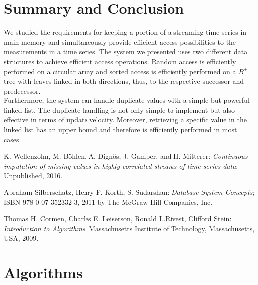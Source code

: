\documentclass[abstracton,12pt,oneside]{scrreprt}
\begin{document}
\chapter{Summary and Conclusion}
\label{sec:Summary}
We studied the requirements for keeping a portion of a streaming time series in main memory and simultaneously provide efficient access possibilities to the measurements in a time series. The system we presented uses two different data structures to achieve efficient access operations. Random access is efficiently performed on a circular array and sorted access is efficiently performed on a $B^+$tree with leaves linked in both directions, thus, to the respective successor and predecessor. \\Furthermore, the system can handle duplicate values with a simple but powerful linked list. The duplicate handling is not only simple to implement but also effective in terms of update velocity. Moreover, retrieving a specific value in the linked list has an upper bound and therefore is efficiently performed in most cases. 






\begin{thebibliography}{99}
	
	
	 K. Wellenzohn, M. Böhlen, A. Dignös, J. Gamper, and H. Mitterer: \emph{Continuous imputation of missing values in highly correlated streams of time series data}; Unpublished, 2016.
	
	 Abraham Silberschatz, Henry F. Korth, S. Sudarshan: \emph{Database System Concepts}; ISBN 978-0-07-352332-3, 2011 by The McGraw-Hill Companies, Inc.
	
	 Thomas H. Cormen, Charles E. Leiserson, Ronald L.Rivest, Clifford Stein: \emph{Introduction to Algorithms}; Massachusetts Institute of Technology, Massachusetts, USA, 2009. 
	
	
\end{thebibliography}




\appendix%

\appendixpage


\addappheadtotoc
\chapter{Algorithms}

\label{app:Algo}
\end{document}
